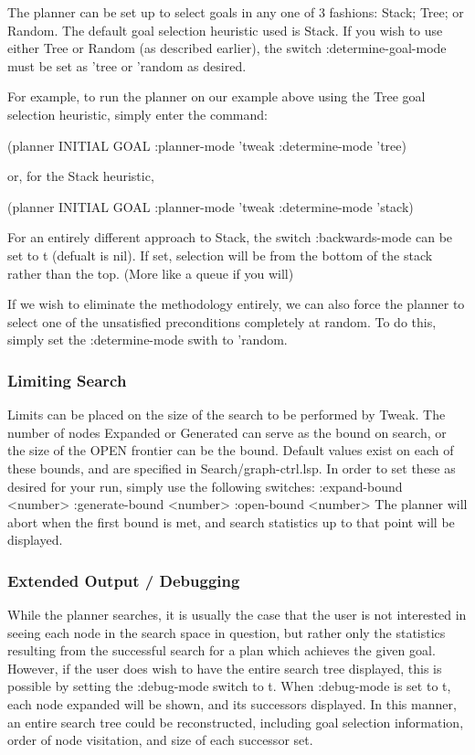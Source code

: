 The planner can be set up to select goals in any one of 3 fashions:
 Stack; Tree; or Random.  The default goal selection heuristic used is
Stack.  If you wish to use either Tree or Random (as described earlier),
the switch :determine-goal-mode must be set as 'tree or 'random as desired.

For example, to run the planner on our example above using the Tree
goal selection heuristic, simply enter the
command:

(planner INITIAL GOAL :planner-mode 'tweak :determine-mode 'tree)

or, for the Stack heuristic,

(planner INITIAL GOAL :planner-mode 'tweak :determine-mode 'stack)

For an entirely different approach to Stack, the switch :backwards-mode can be
set to t (defualt is nil).  If set, selection will be from the bottom of the
stack rather than the top.  (More like a queue if you will)

If we wish to eliminate the methodology entirely, we can also force the planner
to select one of the unsatisfied preconditions completely at random.  To do
this, simply set the :determine-mode swith to 'random.

\subsubsection{Limiting Search}

Limits can be placed on the size of the search to be performed by Tweak.
The number of nodes Expanded or Generated can serve as the bound on search, 
or the size of the OPEN frontier can be the bound.  Default values exist on 
each of these bounds, and are specified in Search/graph-ctrl.lsp.  In order
to set these as desired for your run, simply use the following switches:
:expand-bound <number>    :generate-bound <number> :open-bound <number>
The planner will abort when the first bound is met, and search statistics 
up to that point will be displayed.

\subsubsection{Extended Output / Debugging}

While the planner searches, it is usually the case that the user is not 
interested in seeing each node in the search space in question, but rather 
only the statistics resulting from the successful search for a plan which 
achieves the given goal.  However, if the user does wish to have the entire
search tree displayed, this is possible by setting the :debug-mode switch to 
t.  When :debug-mode is set to t, each node expanded will be shown, and its
successors displayed.  In this manner, an entire search tree could be 
reconstructed, including goal selection information, order of node visitation, and size of each successor set.

